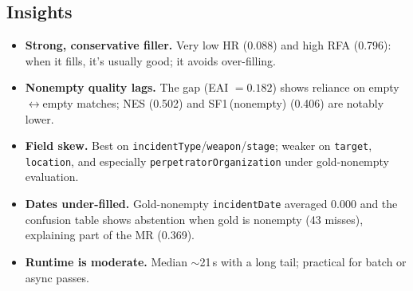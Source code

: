 \subsection*{Insights}

\begin{itemize}
    \item \textbf{Strong, conservative filler.} Very low HR (0.088) and high RFA (0.796): when it fills, it’s usually good; it avoids over-filling.
    \item \textbf{Nonempty quality lags.} The gap (EAI $=0.182$) shows reliance on empty$\leftrightarrow$empty matches; NES (0.502) and SF1\,(nonempty) (0.406) are notably lower.
    \item \textbf{Field skew.} Best on \texttt{incidentType}/\texttt{weapon}/\texttt{stage}; weaker on \texttt{target}, \texttt{location}, and especially \texttt{perpetratorOrganization} under gold-nonempty evaluation.
    \item \textbf{Dates under-filled.} Gold-nonempty \texttt{incidentDate} averaged 0.000 and the confusion table shows abstention when gold is nonempty (43 misses), explaining part of the MR (0.369).
    \item \textbf{Runtime is moderate.} Median $\sim$21\,s with a long tail; practical for batch or async passes.
\end{itemize}
